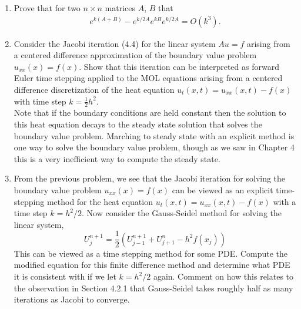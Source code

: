 \documentclass[10pt]{amsart}
\begin{document}
\begin{enumerate}[label={\bf Problem~{\arabic*}:}]
\mline

\item Prove that for two $n \times n$ matrices $A$, $B$ that
  \begin{align*}
    e^{k(A+B)} - e^{k/2 A}e^{k B}e^{k/2 A} = O(k^3).
  \end{align*}

  \mline

  \item Consider the Jacobi iteration (4.4) for the linear system $A u=f$ arising from a centered difference approximation of the boundary value problem $u_{x x}(x)=f(x)$. Show that this iteration can be interpreted as forward Euler time stepping applied to the MOL equations arising from a centered difference discretization of the heat equation $u_{t}(x, t)=u_{x x}(x, t)-f(x)$ with time step $k=\frac{1}{2} h^{2}$.\\
  
Note that if the boundary conditions are held constant then the solution to this heat equation decays to the steady state solution that solves the boundary value problem. Marching to steady state with an explicit method is one way to solve the boundary value problem, though as we saw in Chapter 4 this is a very inefficient way to compute the steady state.
  
  \mline

  \item From the previous problem, we see that the Jacobi iteration for solving the boundary value problem $u_{x x}(x)=f(x)$ can be viewed as an explicit time-stepping method for the heat equation $u_{t}(x, t)=u_{x x}(x, t)-f(x)$ with a time step $k=h^{2} / 2$. Now consider the Gauss-Seidel method for solving the linear system,
$$
U_{j}^{n+1}=\frac{1}{2}\left(U_{j-1}^{n+1}+U_{j+1}^{n}-h^{2} f\left(x_{j}\right)\right)
$$
This can be viewed as a time stepping method for some PDE. Compute the modified equation for this finite difference method and determine what PDE it is consistent with if we let $k=h^{2} / 2$ again. Comment on how this relates to the observation in Section 4.2.1 that Gauss-Seidel takes roughly half as many iterations as Jacobi to converge.
  
  
\end{enumerate}



  
\end{document}

